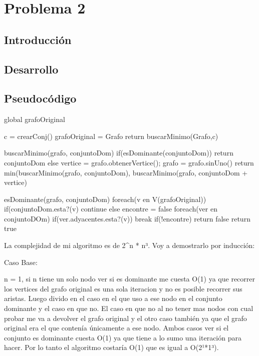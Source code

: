 \section{Problema 2}

\subsection{Introducción}


\subsection{Desarrollo}


\subsection{Pseudocódigo}

global grafoOriginal

\begin{codebox}
\li	c = crearConj()
\li	grafoOriginal = Grafo
\li	return buscarMinimo(Grafo,c)
\end{codebox}

buscarMinimo(grafo, conjuntoDom){
	if(esDominante(conjuntoDom)){
		return conjuntoDom
	}else{
		vertice = grafo.obtenerVertice(); 
		grafo = grafo.sinUno()
		return min(buscarMinimo(grafo, conjuntoDom), buscarMinimo(grafo, conjuntoDom + vertice)
	}
}

esDominante(grafo, conjuntoDom){
	foreach(v en V(grafoOriginal)){
		if(conjuntoDom.esta?(v){
			continue
		}else{
			encontre = false
			foreach(ver en conjuntoDOm){
				if(ver.adyacentes.esta?(v))
					break
			}
			if(!encontre)
				return false
		}
	}
	return true
}

La complejidad de mi algoritmo es de 2^n * n³. Voy a demostrarlo por inducción:

Caso Base:

n = 1, si n tiene un solo nodo ver si es dominante me cuesta O(1) ya que recorrer los vertices del grafo original es una sola iteracion y no es posible recorrer sus aristas. Luego divido en el caso en el que uso a ese nodo en el conjunto dominante y el caso en que no. El caso en que no al no tener mas nodos con cual probar me va a devolver el grafo original y el otro caso también ya que el grafo original era el que contenía únicamente a ese nodo. Ambos casos ver si el conjunto es dominante cuesta O(1) ya que tiene a lo sumo una iteración para hacer. Por lo tanto el algoritmo costaría O(1) que es igual a O(2¹*1³).

